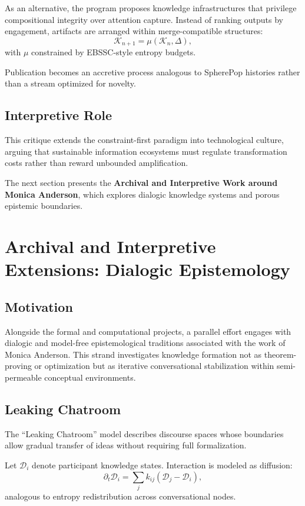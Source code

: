 \documentclass[12pt]{article}
\begin{document}
As an alternative, the program proposes knowledge infrastructures that privilege compositional integrity over attention capture. Instead of ranking outputs by engagement, artifacts are arranged within merge-compatible structures:
\[
\mathcal{K}_{n+1} = \mu(\mathcal{K}_n, \Delta),
\]
with $\mu$ constrained by EBSSC-style entropy budgets.

Publication becomes an accretive process analogous to SpherePop histories rather than a stream optimized for novelty.

\subsection{Interpretive Role}

This critique extends the constraint-first paradigm into technological culture, arguing that sustainable information ecosystems must regulate transformation costs rather than reward unbounded amplification.

\bigskip

The next section presents the \textbf{Archival and Interpretive Work around Monica Anderson}, which explores dialogic knowledge systems and porous epistemic boundaries.

\section{Archival and Interpretive Extensions: Dialogic Epistemology}

\subsection{Motivation}

Alongside the formal and computational projects, a parallel effort engages with dialogic and model-free epistemological traditions associated with the work of Monica Anderson. This strand investigates knowledge formation not as theorem-proving or optimization but as iterative conversational stabilization within semi-permeable conceptual environments.

\subsection{Leaking Chatroom}

The ``Leaking Chatroom'' model describes discourse spaces whose boundaries allow gradual transfer of ideas without requiring full formalization.

Let $\mathcal{D}_i$ denote participant knowledge states. Interaction is modeled as diffusion:
\[
\partial_t \mathcal{D}_i = \sum_j k_{ij}(\mathcal{D}_j-\mathcal{D}_i),
\]
analogous to entropy redistribution across conversational nodes.
\end{document}
